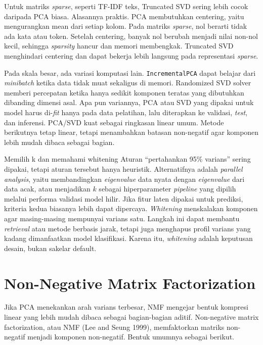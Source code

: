 Untuk matriks \emph{sparse}, seperti TF-IDF teks, Truncated SVD sering lebih cocok daripada PCA biasa. Alasannya praktis. PCA membutuhkan centering, yaitu mengurangkan mean dari setiap kolom. Pada matriks \emph{sparse}, nol berarti tidak ada kata atau token. Setelah centering, banyak nol berubah menjadi nilai non-nol kecil, sehingga \emph{sparsity} hancur dan memori membengkak. Truncated SVD menghindari centering dan dapat bekerja lebih langsung pada representasi \emph{sparse}.

Pada skala besar, ada variasi komputasi lain. \passthrough{\lstinline!IncrementalPCA!} dapat belajar dari \emph{minibatch} ketika data tidak muat sekaligus di memori. Randomized SVD solver memberi percepatan ketika hanya sedikit komponen teratas yang dibutuhkan dibanding dimensi asal. Apa pun variannya, PCA atau SVD yang dipakai untuk model harus di-\emph{fit} hanya pada data pelatihan, lalu diterapkan ke validasi, \emph{test}, dan inferensi. PCA/SVD kuat sebagai ringkasan linear umum. Metode berikutnya tetap linear, tetapi menambahkan batasan non-negatif agar komponen lebih mudah dibaca sebagai bagian.

\begin{pendalaman}{Memilih k dan memahami whitening}
Aturan ``pertahankan 95\% varians'' sering dipakai, tetapi aturan tersebut hanya heuristik. Alternatifnya adalah \emph{parallel analysis}, yaitu membandingkan \emph{eigenvalue} data nyata dengan \emph{eigenvalue} dari data acak, atau menjadikan \(k\) sebagai hiperparameter \emph{pipeline} yang dipilih melalui performa validasi model hilir. Jika fitur laten dipakai untuk prediksi, kriteria kedua biasanya lebih dapat dipercaya. \emph{Whitening} menskalakan komponen agar masing-masing mempunyai varians satu. Langkah ini dapat membantu \emph{retrieval} atau metode berbasis jarak, tetapi juga menghapus profil varians yang kadang dimanfaatkan model klasifikasi. Karena itu, \emph{whitening} adalah keputusan desain, bukan sakelar default.
\end{pendalaman}

\section{Non-Negative Matrix Factorization}\label{non-negative-matrix-factorization}

Jika PCA menekankan arah varians terbesar, NMF mengejar bentuk kompresi linear yang lebih mudah dibaca sebagai bagian-bagian aditif. Non-negative matrix factorization, atau NMF (Lee and Seung 1999), memfaktorkan matriks non-negatif menjadi komponen non-negatif. Bentuk umumnya sebagai berikut.

